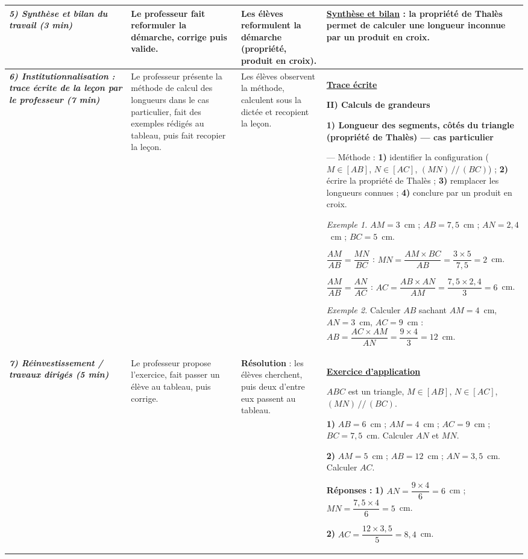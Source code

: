 \documentclass[10pt]{article}
\newcommand{\titreR}[1]{\underline{\textcolor{rougetitre}{\bfseries #1}}}
\newcommand{\app}{\titreR{Exercice d'application}}
\newcommand{\moment}[1]{\textbf{\itshape #1}}
\newcommand{\mclef}[1]{\colorbox{jaunesurl}{#1}}
\begin{document}
\begin{longtable}{|p{2.35cm}|p{5.35cm}|p{4.55cm}|p{13.85cm}|}
\moment{5) Synthèse et bilan du travail (3 min)} &
Le professeur fait reformuler la démarche, corrige puis valide. &
Les élèves reformulent  la démarche (propriété, produit en croix). &
\titreR{Synthèse et bilan} : la propriété de Thalès permet de calculer une longueur
inconnue par un produit en croix. \\ \hline

\moment{6) Institutionnalisation : trace écrite de la leçon par le professeur (7 min)} &
Le professeur présente la méthode de calcul des longueurs dans le cas particulier, fait des exemples rédigés au tableau, puis fait recopier la leçon. &
Les élèves observent  la méthode, calculent sous la dictée et recopient la leçon. &
\titreR{Trace écrite} \par
\textbf{II) Calculs de grandeurs} \par
\textbf{1) Longueur des segments, côtés du triangle (propriété de Thalès) — cas
particulier} \par
— \mclef{Méthode :} \textbf{1)} identifier la configuration ($M\in[AB]$,
$N\in[AC]$, $(MN)\,//\,(BC)$) ; \textbf{2)} écrire la propriété de Thalès ;
\textbf{3)} remplacer les longueurs connues ; \textbf{4)} conclure par un produit en
croix. \par
\textit{Exemple 1.} $AM=3$~cm ; $AB=7{,}5$~cm ; $AN=2{,}4$~cm ; $BC=5$~cm. \par
$\dfrac{AM}{AB}=\dfrac{MN}{BC}$ : $MN=\dfrac{AM\times BC}{AB}
=\dfrac{3\times5}{7{,}5}=2$~cm. \par
$\dfrac{AM}{AB}=\dfrac{AN}{AC}$ : $AC=\dfrac{AB\times AN}{AM}
=\dfrac{7{,}5\times2{,}4}{3}=6$~cm. \par
\textit{Exemple 2.} Calculer $AB$ sachant $AM=4$~cm, $AN=3$~cm, $AC=9$~cm : \;
$AB=\dfrac{AC\times AM}{AN}=\dfrac{9\times4}{3}=12$~cm. \\ \hline

\moment{7) Réinvestissement / travaux dirigés (5 min)} &
Le professeur propose l'exercice, fait passer un élève au tableau, puis corrige. &
\textbf{Résolution} : les élèves cherchent, puis deux d'entre eux passent au tableau. &
\app \par
$ABC$ est un triangle, $M\in[AB]$, $N\in[AC]$, $(MN)\,//\,(BC)$. \par
\textbf{1)} $AB=6$~cm ; $AM=4$~cm ; $AC=9$~cm ; $BC=7{,}5$~cm. Calculer $AN$ et $MN$. \par
\textbf{2)} $AM=5$~cm ; $AB=12$~cm ; $AN=3{,}5$~cm. Calculer $AC$. \par
\textbf{Réponses :} \textbf{1)} $AN=\dfrac{9\times4}{6}=6$~cm ; \;
$MN=\dfrac{7{,}5\times4}{6}=5$~cm. \par
\textbf{2)} $AC=\dfrac{12\times3{,}5}{5}=8{,}4$~cm. \\ \hline


\end{longtable}
\end{document}
